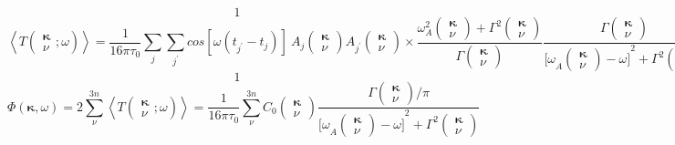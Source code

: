 \[1\] 
\[\left\langle T\left( \begin{array}{c}
{\mathbf \kappa } \\ 
\nu  \end{array}
;\omega \right)\right\rangle =\frac{1}{16\pi {\tau }_0}\sum\limits_j{\sum\limits_{j^'}{{cos [\omega \left(t_{j^'}-t_j\right)]\ }A_j\left( \begin{array}{c}
{\mathbf \kappa } \\ 
\nu  \end{array}
\right)A_{j^'}\left( \begin{array}{c}
{\mathbf \kappa } \\ 
\nu  \end{array}
\right)\times \frac{{\omega }^2_A\left( \begin{array}{c}
{\mathbf \kappa } \\ 
\nu  \end{array}
\right)+{\Gamma }^2\left( \begin{array}{c}
{\mathbf \kappa } \\ 
\nu  \end{array}
\right)}{\Gamma \left( \begin{array}{c}
{\mathbf \kappa } \\ 
\nu  \end{array}
\right)}}\frac{\Gamma \left( \begin{array}{c}
{\mathbf \kappa } \\ 
\nu  \end{array}
\right)}{{{[\omega }_A\left( \begin{array}{c}
{\mathbf \kappa } \\ 
\nu  \end{array}
\right)-\omega ]}^2+{\Gamma }^2\left( \begin{array}{c}
{\mathbf \kappa } \\ 
\nu  \end{array}
\right)}}\] 
\[1\] 
\[\Phi \left({\mathbf \kappa },\omega \right)=2\sum\limits^{3n}_{\nu }{\left\langle T\left( \begin{array}{c}
{\mathbf \kappa } \\ 
\nu  \end{array}
;\omega \right)\right\rangle }=\frac{1}{16\pi {\tau }_0}\sum\limits^{3n}_{\nu }{C_0\left( \begin{array}{c}
{\mathbf \kappa } \\ 
\nu  \end{array}
\right)\frac{\Gamma \left( \begin{array}{c}
{\mathbf \kappa } \\ 
\nu  \end{array}
\right)/\pi }{{{[\omega }_A\left( \begin{array}{c}
{\mathbf \kappa } \\ 
\nu  \end{array}
\right)-\omega ]}^2+{\Gamma }^2\left( \begin{array}{c}
{\mathbf \kappa } \\ 
\nu  \end{array}
\right)}}\] 
